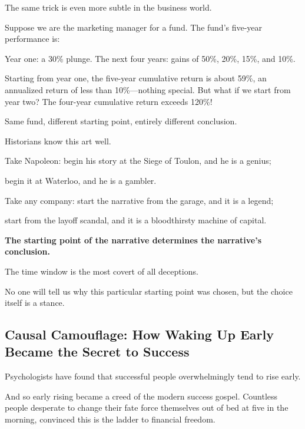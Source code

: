 \vspace{1em}

The same trick is even more subtle in the business world.

Suppose we are the marketing manager for a fund. The fund's five-year performance is:

Year one: a 30\% plunge. The next four years: gains of 50\%, 20\%, 15\%, and 10\%.

Starting from year one, the five-year cumulative return is about 59\%, an annualized return of less than 10\%---nothing special.
But what if we start from year two? The four-year cumulative return exceeds 120\%!

Same fund, different starting point, entirely different conclusion.

\vspace{1em}

Historians know this art well.

Take Napoleon: begin his story at the Siege of Toulon, and he is a genius;

begin it at Waterloo, and he is a gambler.

Take any company: start the narrative from the garage, and it is a legend;

start from the layoff scandal, and it is a bloodthirsty machine of capital.

\textbf{The starting point of the narrative determines the narrative's conclusion.}

The time window is the most covert of all deceptions.

\begin{importantbox}
No one will tell us why this particular starting point was chosen, but the choice itself is a stance.
\end{importantbox}

\subsection{Causal Camouflage: How Waking Up Early Became the Secret to Success}

Psychologists have found that successful people overwhelmingly tend to rise early.

And so early rising became a creed of the modern success gospel. Countless people desperate to change their fate force themselves out of bed at five in the morning, convinced this is the ladder to financial freedom.

\vspace{1em}

